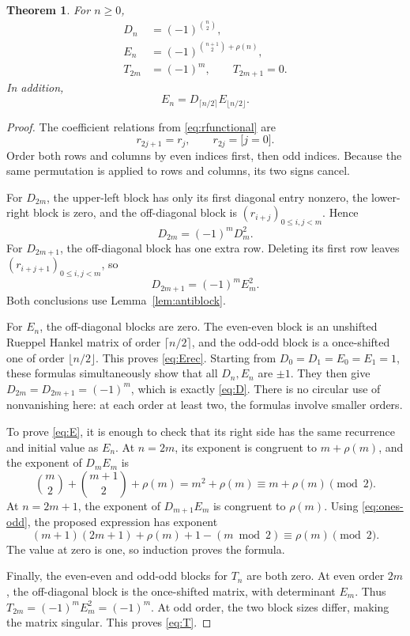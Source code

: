 \documentclass[11pt,a4paper]{article}
\numberwithin{equation}{section}
\newtheorem{theorem}{Theorem}[section]
\theoremstyle{definition}
\theoremstyle{remark}
\newcommand{\Ones}{\rho}
\newcommand{\ind}[1]{\boldsymbol{[}#1\boldsymbol{]}}
\begin{document}
\begin{theorem}\label{thm:DE}
For $n\ge0$,
\begin{align}
 D_n&=(-1)^{\binom n2},\label{eq:D}\\
 E_n&=(-1)^{\binom{n+1}{2}+\Ones(n)},\label{eq:E}\\
 T_{2m}&=(-1)^m,\qquad T_{2m+1}=0.\label{eq:T}
\end{align}
In addition,
\begin{equation}\label{eq:Erec}
 E_n=D_{\lceil n/2\rceil}E_{\lfloor n/2\rfloor}.
\end{equation}
\end{theorem}
\begin{proof}
The coefficient relations from \eqref{eq:rfunctional} are
\begin{equation}\label{eq:rparity}
 r_{2j+1}=r_j,\qquad r_{2j}=\ind{j=0}.
\end{equation}
Order both rows and columns by even indices first, then odd indices.
Because the same permutation is applied to rows and columns, its two
signs cancel.

For $D_{2m}$, the upper-left block has only its first diagonal entry
nonzero, the lower-right block is zero, and the off-diagonal block is
$(r_{i+j})_{0\le i,j<m}$. Hence
\[
 D_{2m}=(-1)^mD_m^2.
\]
For $D_{2m+1}$, the off-diagonal block has one extra row. Deleting its
first row leaves $(r_{i+j+1})_{0\le i,j<m}$, so
\[
 D_{2m+1}=(-1)^mE_m^2.
\]
Both conclusions use Lemma~\ref{lem:antiblock}.

For $E_n$, the off-diagonal blocks are zero. The even-even block is
an unshifted Rueppel Hankel matrix of order $\lceil n/2\rceil$, and the
odd-odd block is a once-shifted one of order $\lfloor n/2\rfloor$.
This proves \eqref{eq:Erec}. Starting from
$D_0=D_1=E_0=E_1=1$, these formulas simultaneously show that all
$D_n,E_n$ are $\pm1$. They then give
$D_{2m}=D_{2m+1}=(-1)^m$, which is exactly \eqref{eq:D}.
There is no circular use of nonvanishing here: at each order at least
two, the formulas involve smaller orders.

To prove \eqref{eq:E}, it is enough to check that its right side has the
same recurrence and initial value as $E_n$. At $n=2m$, its exponent is
congruent to $m+\Ones(m)$, and the exponent of $D_mE_m$ is
\[
 \binom m2+\binom{m+1}{2}+\Ones(m)
 =m^2+\Ones(m)\equiv m+\Ones(m)\pmod2.
\]
At $n=2m+1$, the exponent of $D_{m+1}E_m$ is congruent to
$\Ones(m)$. Using \eqref{eq:ones-odd}, the proposed expression has
exponent
\[
 (m+1)(2m+1)+\Ones(m)+1-(m\bmod2)
 \equiv\Ones(m)\pmod2.
\]
The value at zero is one, so induction proves the formula.

Finally, the even-even and odd-odd blocks for $T_n$ are both zero.
At even order $2m$, the off-diagonal block is the once-shifted matrix,
with determinant $E_m$. Thus $T_{2m}=(-1)^mE_m^2=(-1)^m$.
At odd order, the two block sizes differ, making the matrix singular.
This proves \eqref{eq:T}.
\end{proof}
\end{document}
